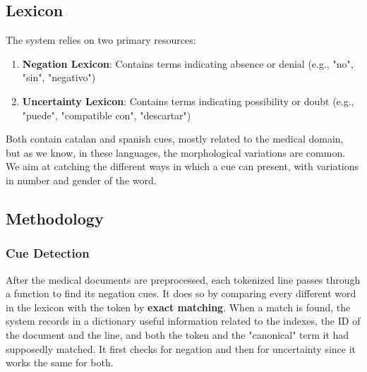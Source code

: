 \documentclass[9pt,a4paper,twoside]{tau-class/tau}
\begin{document}
    \subsection{Lexicon}
        The system relies on two primary resources: 
        \begin{enumerate}
            \item \textbf{Negation Lexicon}: Contains terms indicating absence or denial (e.g., "no", "sin", "negativo") 
            \item \textbf{Uncertainty Lexicon}: Contains terms indicating possibility or doubt (e.g., "puede", "compatible con", "descartar")
        \end{enumerate}
        
        Both contain catalan and spanish cues, mostly related to the medical domain, but as we know, in these languages, the morphological variations are common. We aim at catching the different ways in which a cue can present, with variations in number and gender of the word.

        
    \subsection{Methodology}
        \subsubsection{Cue Detection}
        After the medical documents are preprocessed, each tokenized line passes through a function to find its negation cues. It does so by comparing every different word in the lexicon with the token by \textbf{exact matching}. When a match is found, the system records in a dictionary useful information related to the indexes, the ID of the document and the line, and both the token and the "canonical" term it had supposedly matched. It first checks for negation and then for uncertainty since it works the same for both.
\end{document}
